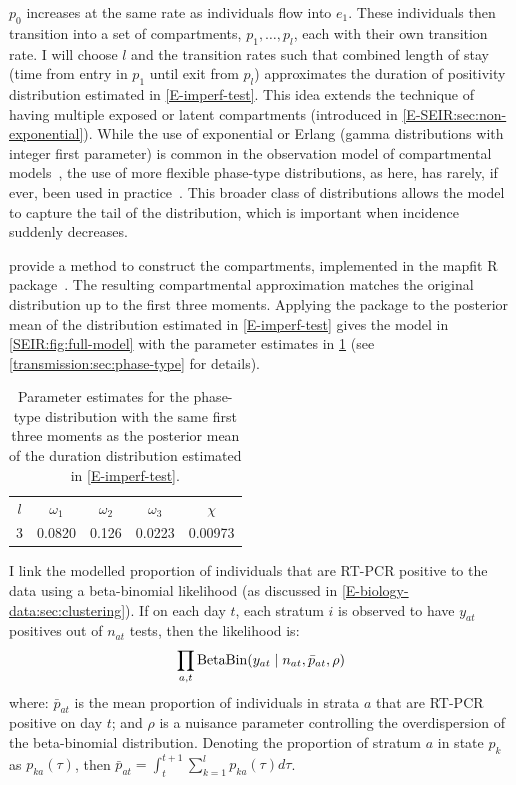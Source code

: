 \documentclass[thesis.tex]{subfiles}
\begin{document}
$p_0$ increases at the same rate as individuals flow into $e_1$.
These individuals then transition into a set of compartments, $p_1, \dots, p_l$, each with their own transition rate.
I will choose $l$ and the transition rates such that combined length of stay (\ie time from entry in $p_1$ until exit from $p_l$) approximates the duration of positivity distribution estimated in \cref{E-imperf-test}.
This idea extends the technique of having multiple exposed or latent compartments (introduced in \cref{E-SEIR:sec:non-exponential}).
While the use of exponential or Erlang (gamma distributions with integer first parameter) is common in the observation model of compartmental models~\autocite[e.g.][]{overtonEpiBeds}, the use of more flexible phase-type distributions, as here, has rarely, if ever, been used in practice~\autocite{hurtadoGLCT}.
This broader class of distributions allows the model to capture the tail of the distribution, which is important when incidence suddenly decreases.

\Textcite{osogamiClosed} provide a method to construct the compartments, implemented in the mapfit R package~\autocite{mapfit}. 
The resulting compartmental approximation matches the original distribution up to the first three moments.
Applying the package to the posterior mean of the distribution estimated in \cref{E-imperf-test} gives the model in \cref{SEIR:fig:full-model} with the parameter estimates in \cref{SEIR:table:ec-params} (see \cref{transmission:sec:phase-type} for details).
\begin{table}
    \centering
    \begin{tabular}{c c c c c}
        $l$ & $\omega_1$ & $\omega_{2}$ & $\omega_{3}$ & $\chi$ \\
        3 & 0.0820 & 0.126 & 0.0223 & 0.00973  \\
    \end{tabular}
    \caption{Parameter estimates for the phase-type distribution with the same first three moments as the posterior mean of the duration distribution estimated in \cref{E-imperf-test}.}
    \label{SEIR:table:ec-params}
\end{table}

I link the modelled proportion of individuals that are RT-PCR positive to the data using a beta-binomial likelihood (as discussed in \cref{E-biology-data:sec:clustering}).
If on each day $t$, each stratum $i$ is observed to have $y_{at}$ positives out of $n_{at}$ tests, then the likelihood is:
\begin{align}
    \prod_{a,t} \operatorname{BetaBin} (y_{at} \mid n_{at}, \bar{p}_{at}, \rho)
    \label{SEIR:eq:likelihood}
\end{align}
where: $\bar{p}_{at}$ is the mean proportion of individuals in strata $a$ that are RT-PCR positive on day $t$; and $\rho$ is a nuisance parameter controlling the overdispersion of the beta-binomial distribution.
Denoting the proportion of stratum $a$ in state $p_k$ as $p_{ka}(\tau)$, then $\bar{p}_{at} = \int_{t}^{t+1} \sum_{k=1}^l p_{ka}(\tau) d\tau$.
\end{document}
